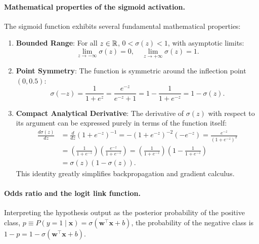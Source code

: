 \paragraph{Mathematical properties of the sigmoid activation.}
The sigmoid function exhibits several fundamental mathematical properties:
\begin{enumerate}
  \item \textbf{Bounded Range}: For all $z \in \mathbb{R}$, $0 < \sigma(z) < 1$, with asymptotic limits:
    \begin{equation}
    \lim_{z \to -\infty} \sigma(z) = 0, \quad \lim_{z \to +\infty} \sigma(z) = 1.
    \end{equation}
  \item \textbf{Point Symmetry}: The function is symmetric around the inflection point $(0, 0.5)$:
    \begin{equation}
    \sigma(-z) = \frac{1}{1 + e^z} = \frac{e^{-z}}{e^{-z} + 1} = 1 - \frac{1}{1 + e^{-z}} = 1 - \sigma(z).
    \label{eq:sigmoid_symmetry}
    \end{equation}
  \item \textbf{Compact Analytical Derivative}: The derivative of $\sigma(z)$ with respect to its argument can be expressed purely in terms of the function itself:
    \begin{align}
    \frac{d\sigma(z)}{dz} &= \frac{d}{dz} (1 + e^{-z})^{-1} = -(1 + e^{-z})^{-2} (-e^{-z}) = \frac{e^{-z}}{(1 + e^{-z})^2} \nonumber \\
    &= \left( \frac{1}{1 + e^{-z}} \right) \left( \frac{e^{-z}}{1 + e^{-z}} \right) = \left( \frac{1}{1 + e^{-z}} \right) \left( 1 - \frac{1}{1 + e^{-z}} \right) \nonumber \\
    &= \sigma(z)(1 - \sigma(z)).
    \label{eq:sigmoid_derivative_proof}
    \end{align}
    This identity greatly simplifies backpropagation and gradient calculus.
\end{enumerate}

\paragraph{Odds ratio and the logit link function.}
Interpreting the hypothesis output as the posterior probability of the positive class, $p \equiv P(y=1 \mid \mathbf{x}) = \sigma(\mathbf{w}^\top \mathbf{x} + b)$, the probability of the negative class is $1 - p = 1 - \sigma(\mathbf{w}^\top \mathbf{x} + b)$.

